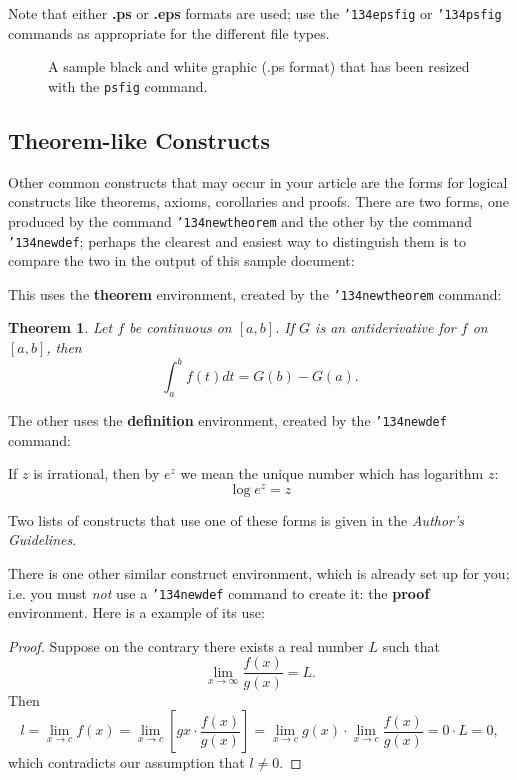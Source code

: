 \documentclass{sig-alternate-sigmod08}
\begin{document}
Note that either {\textbf{.ps}} or {\textbf{.eps}} formats are
used; use
the \texttt{{\char'134}epsfig} or \texttt{{\char'134}psfig}
commands as appropriate for the different file types.

\begin{figure}
\centering
{}
\caption{A sample black and white graphic (.ps format) that has
been resized with the \texttt{psfig} command.}
\end{figure}

\subsection{Theorem-like Constructs}
Other common constructs that may occur in your article are
the forms for logical constructs like theorems, axioms,
corollaries and proofs.  There are
two forms, one produced by the
command \texttt{{\char'134}newtheorem} and the
other by the command \texttt{{\char'134}newdef}; perhaps
the clearest and easiest way to distinguish them is
to compare the two in the output of this sample document:

This uses the \textbf{theorem} environment, created by
the \texttt{{\char'134}newtheorem} command:
\newtheorem{theorem}{Theorem}
\begin{theorem}
Let $f$ be continuous on $[a,b]$.  If $G$ is
an antiderivative for $f$ on $[a,b]$, then
\begin{displaymath}\int^b_af(t)dt = G(b) - G(a).\end{displaymath}
\end{theorem}

The other uses the \textbf{definition} environment, created
by the \texttt{{\char'134}newdef} command:
\begin{definition}
If $z$ is irrational, then by $e^z$ we mean the
unique number which has
logarithm $z$: \begin{displaymath}{\log e^z = z}\end{displaymath}
\end{definition}

Two lists of constructs that use one of these
forms is given in the
\textit{Author's  Guidelines}.

There is one other similar construct environment, which is
already set up
for you; i.e. you must \textit{not} use
a \texttt{{\char'134}newdef} command to
create it: the \textbf{proof} environment.  Here
is a example of its use:
\begin{proof}
Suppose on the contrary there exists a real number $L$ such that
\begin{displaymath}
\lim_{x\rightarrow\infty} \frac{f(x)}{g(x)} = L.
\end{displaymath}
Then
\begin{displaymath}
l=\lim_{x\rightarrow c} f(x)
= \lim_{x\rightarrow c}
\left[ g{x} \cdot \frac{f(x)}{g(x)} \right ]
= \lim_{x\rightarrow c} g(x) \cdot \lim_{x\rightarrow c}
\frac{f(x)}{g(x)} = 0\cdot L = 0,
\end{displaymath}
which contradicts our assumption that $l\neq 0$.
\end{proof}
\end{document}
